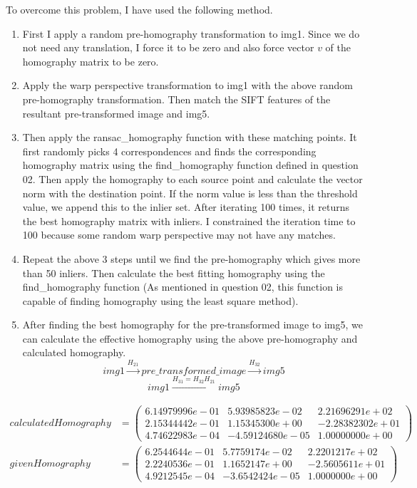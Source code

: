 \documentclass[a4paper]{article}
\begin{document}
To overcome this problem, I have used the following method.
\begin{enumerate}
  \itemsep0em 
  \item First I apply a random pre-homography
   transformation to img1. Since we do not need
    any translation, I force it to be zero and
     also force vector $v$ of the homography matrix to be zero.
  \item Apply the warp perspective transformation to img1 with
   the above random pre-homography transformation. Then match
    the SIFT features of the resultant pre-transformed image 
    and img5.
  \item Then apply the ransac\_homography function with these matching
   points. It first randomly picks 4 correspondences and finds the
    corresponding homography matrix using the find\_homography
     function defined in question 02. Then apply the homography
      to each source point and calculate the vector norm with
       the destination point. If the norm value is less than
        the threshold value, we append this to the inlier set.
         After iterating 100 times, it returns the best homography
          matrix with inliers. I constrained the iteration time to 
          100 because some random warp perspective may not have
           any matches.
  \item Repeat the above 3 steps until we find the pre-homography
   which gives more than 50 inliers. Then calculate the best fitting
    homography using the find\_homography function 
    (As mentioned in question 02, this function is capable
     of finding homography using the least square method).
  \item After finding the best homography
   for the pre-transformed image to img5,
    we can calculate the effective homography using
     the above pre-homography and calculated homography.
     $$img1 \xrightarrow{H_{21}} pre\_transformed\_image \xrightarrow{H_{32}} img5$$
     $$img1 \xrightarrow{H_{31}=H_{32}H_{21}}  img5$$
\end{enumerate}
\begin{align*}
  calculatedHomography&=
  \begin{pmatrix}
     6.14979996e-01&  5.93985823e-02 & 2.21696291e+02\\
     2.15344442e-01  &1.15345300e+00 &-2.28382302e+01\\
  4.74622983e-04 &-4.59124680e-05&  1.00000000e+00
  \end{pmatrix} \\ givenHomography&=
  \begin{pmatrix}
    6.2544644e-01 &  5.7759174e-02 &  2.2201217e+02\\
    2.2240536e-01 &  1.1652147e+00 & -2.5605611e+01\\
    4.9212545e-04 & -3.6542424e-05 &  1.0000000e+00
  \end{pmatrix}
\end{align*}
\end{document}
